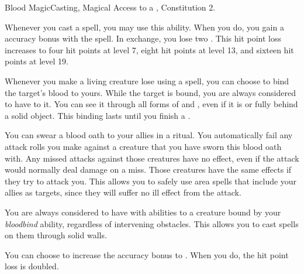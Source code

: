   \begin{magicalfeat}{Blood Magic}{Casting, Magical}
    \featpre Access to a , Constitution 2.

     Whenever you cast a spell, you may use this ability.
    When you do, you gain a  accuracy bonus with the spell.
    In exchange, you lose two .
    This hit point loss increases to four hit points at level 7, eight hit points at level 13, and sixteen hit points at level 19.

     Whenever you make a living creature lose  using a spell, you can choose to bind the target's blood to yours.
    While the target is bound, you are always considered to have  to it.
    You can see it through all forms of  and , even if it is  or fully behind a solid object.
    This binding lasts until you finish a .

     You can swear a blood oath to your allies in a ritual.
    You automatically fail any attack rolls you make against a creature that you have sworn this blood oath with.
    Any missed attacks against those creatures have no effect, even if the attack would normally deal damage on a miss.
    Those creatures have the same effects if they try to attack you.
    This allows you to safely use area spells that include your allies as targets, since they will suffer no ill effect from the attack.

     You are always considered to have  with \magical abilities to a creature bound by your \textit{bloodbind} ability, regardless of intervening obstacles.
    This allows you to cast spells on them through solid walls.

     You can choose to increase the accuracy bonus to .
    When you do, the hit point loss is doubled.
  \end{magicalfeat}

